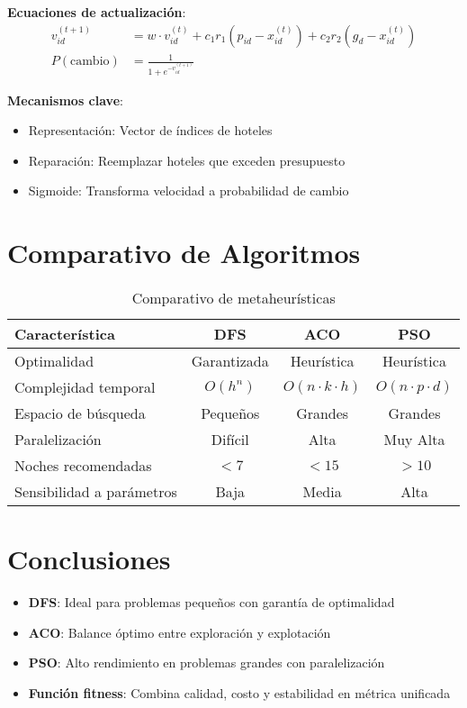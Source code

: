 \documentclass{article}
\begin{document}
\textbf{Ecuaciones de actualización}:
\begin{align*}
v_{id}^{(t+1)} &= w \cdot v_{id}^{(t)} + c_1 r_1 (p_{id} - x_{id}^{(t)}) + c_2 r_2 (g_d - x_{id}^{(t)}) \\
P(\text{cambio}) &= \frac{1}{1 + e^{-v_{id}^{(t+1)}}}
\end{align*}

\textbf{Mecanismos clave}:
\begin{itemize}
    \item Representación: Vector de índices de hoteles
    \item Reparación: Reemplazar hoteles que exceden presupuesto
    \item Sigmoide: Transforma velocidad a probabilidad de cambio
\end{itemize}

\section{Comparativo de Algoritmos}
\begin{table}[h]
\centering
\begin{tabular}{lccc}
\toprule
Característica & DFS & ACO & PSO \\
\midrule
Optimalidad & Garantizada & Heurística & Heurística \\
Complejidad temporal & $O(h^n)$ & $O(n \cdot k \cdot h)$ & $O(n \cdot p \cdot d)$ \\
Espacio de búsqueda & Pequeños & Grandes & Grandes \\
Paralelización & Difícil & Alta & Muy Alta \\
Noches recomendadas & $<7$ & $<15$ & $>10$ \\
Sensibilidad a parámetros & Baja & Media & Alta \\
\bottomrule
\end{tabular}
\caption{Comparativo de metaheurísticas}
\end{table}

\section{Conclusiones}
\begin{itemize}
    \item \textbf{DFS}: Ideal para problemas pequeños con garantía de optimalidad
    \item \textbf{ACO}: Balance óptimo entre exploración y explotación
    \item \textbf{PSO}: Alto rendimiento en problemas grandes con paralelización
    \item \textbf{Función fitness}: Combina calidad, costo y estabilidad en métrica unificada
\end{itemize}
\end{document}
